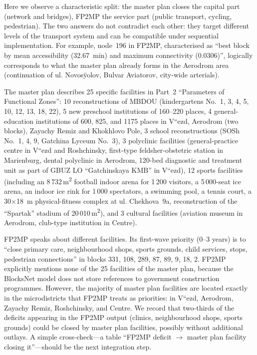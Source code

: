 Here we observe a characteristic split: the master plan closes the capital part (network and bridges), FP2MP the service part (public transport, cycling, pedestrian). The two answers do not contradict each other: they target different levels of the transport system and can be compatible under sequential implementation. For example, node~196 in FP2MP, characterised as ``best block by mean accessibility (32.67~min) and maximum connectivity (0.0306)'', logically corresponds to what the master plan already forms in the Aerodrom area (continuation of ul. Novos\"yolov, Bulvar Aviatorov, city-wide arterials).
 
The master plan describes 25 specific facilities in Part~2 ``Parameters of Functional Zones'': 10 reconstructions of MBDOU (kindergartens No.~1, 3, 4, 5, 10, 12, 13, 18, 22), 5 new preschool institutions of 160--220 places, 4 general-education institutions of 600, 825, and 1175 places in V``ezd, Aerodrom (two blocks), Zayachy Remiz and Khokhlovo Pole, 3 school reconstructions (SOSh No.~1, 4, 9, Gatchina Lyceum No.~3), 3 polyclinic facilities (general-practice centre in V``ezd and Roshchinsky, first-type feldsher-obstetric station in Marienburg, dental polyclinic in Aerodrom, 120-bed diagnostic and treatment unit as part of GBUZ LO ``Gatchinskaya KMB'' in V``ezd), 12 sports facilities (including an 8\,732\,m\textsuperscript{2} football indoor arena for 1\,200 visitors, a 5\,000-seat ice arena, an indoor ice rink for 1\,000 spectators, a swimming pool, a tennis court, a 30$\times$18~m physical-fitness complex at ul. Chekhova~9a, reconstruction of the ``Spartak'' stadium of 20\,010\,m\textsuperscript{2}), and 3 cultural facilities (aviation museum in Aerodrom, club-type institution in Centre).
 
FP2MP speaks about different facilities. Its first-wave priority (0--3 years) is to ``close primary care, neighbourhood shops, sports grounds, child services, stops, pedestrian connections'' in blocks 331, 108, 289, 87, 89, 9, 18, 2. FP2MP explicitly mentions none of the 25 facilities of the master plan, because the BlocksNet model does not store references to government construction programmes. However, the majority of master plan facilities are located exactly in the microdistricts that FP2MP treats as priorities: in V``ezd, Aerodrom, Zayachy Remiz, Roshchinsky, and Centre. We record that two-thirds of the deficits appearing in the FP2MP output (clinics, neighbourhood shops, sports grounds) could be closed by master plan facilities, possibly without additional outlays. A simple cross-check---a table ``FP2MP deficit $\to$ master plan facility closing it''---should be the next integration step.
 
